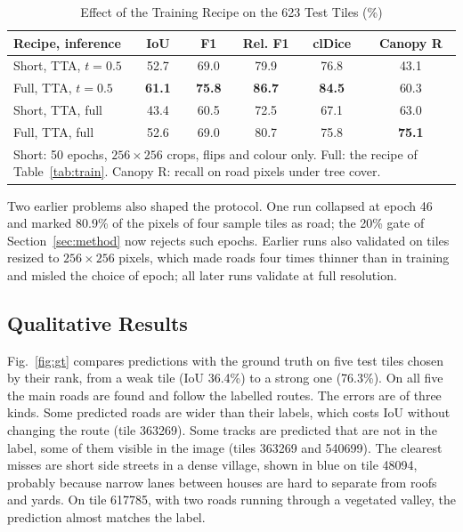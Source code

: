 \documentclass{ieeeaccess}
\begin{document}
\begin{table}[t]
\caption{Effect of the Training Recipe on the 623 Test Tiles (\%)}
\label{tab:recipe}
\setlength{\tabcolsep}{3pt}
\tablebodyfont
\begin{tabular}{|l|c|c|c|c|c|}
\hline
Recipe, inference & IoU & F1 & Rel. F1 & clDice & Canopy R \\
\hline
Short, TTA, $t = 0.5$ & 52.7 & 69.0 & 79.9 & 76.8 & 43.1 \\
Full, TTA, $t = 0.5$ & \textbf{61.1} & \textbf{75.8} & \textbf{86.7} & \textbf{84.5} & 60.3 \\
Short, TTA, full & 43.4 & 60.5 & 72.5 & 67.1 & 63.0 \\
Full, TTA, full & 52.6 & 69.0 & 80.7 & 75.8 & \textbf{75.1} \\
\hline
\multicolumn{6}{p{215pt}}{Short: 50 epochs, $256 \times 256$ crops, flips and colour only. Full: the recipe of Table~\ref{tab:train}. Canopy R: recall on road pixels under tree cover.}
\end{tabular}
\end{table}

Two earlier problems also shaped the protocol. One run collapsed at epoch 46 and marked 80.9\% of the pixels of four sample tiles as road; the 20\% gate of Section~\ref{sec:method} now rejects such epochs. Earlier runs also validated on tiles resized to $256 \times 256$ pixels, which made roads four times thinner than in training and misled the choice of epoch; all later runs validate at full resolution.

\subsection{Qualitative Results}

Fig.~\ref{fig:gt} compares predictions with the ground truth on five test tiles chosen by their rank, from a weak tile (IoU 36.4\%) to a strong one (76.3\%). On all five the main roads are found and follow the labelled routes. The errors are of three kinds. Some predicted roads are wider than their labels, which costs IoU without changing the route (tile 363269). Some tracks are predicted that are not in the label, some of them visible in the image (tiles 363269 and 540699). The clearest misses are short side streets in a dense village, shown in blue on tile 48094, probably because narrow lanes between houses are hard to separate from roofs and yards. On tile 617785, with two roads running through a vegetated valley, the prediction almost matches the label.
\end{document}
